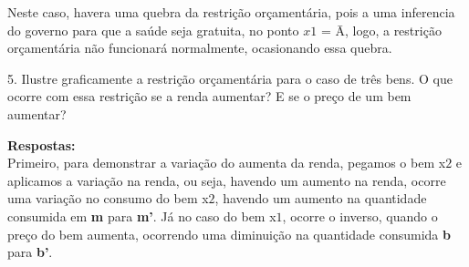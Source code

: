 \begin{flushleft}
\begin{center}
\begin{tikzpicture}
\end{tikzpicture}    
\singlespacing

\end{center}

Neste caso, havera uma quebra da restrição orçamentária, pois a uma inferencia do governo para que a saúde seja gratuita, no ponto $\textit{x1}$ = Ā, logo, a restrição orçamentária não funcionará normalmente, ocasionando essa quebra. \singlespacing

5. Ilustre graficamente a restrição orçamentária para o caso de três bens. O que ocorre com essa restrição se a renda aumentar? E se o preço de um bem aumentar? \singlespacing

\textbf{Respostas:} 
\\
Primeiro, para demonstrar a variação do aumenta da renda, pegamos o bem x$\textit{2}$ e aplicamos a variação na renda, ou seja, havendo um aumento na renda, ocorre uma variação no consumo do bem x$\textit{2}$, havendo um aumento na quantidade consumida em \textbf{m} para \textbf{m'}. Já no caso do bem x$\textit{1}$, ocorre o inverso, quando o preço do bem aumenta, ocorrendo uma diminuição na quantidade consumida \textbf{b} para \textbf{b'}.

\begin{center}

\end{center}


\end{flushleft}
